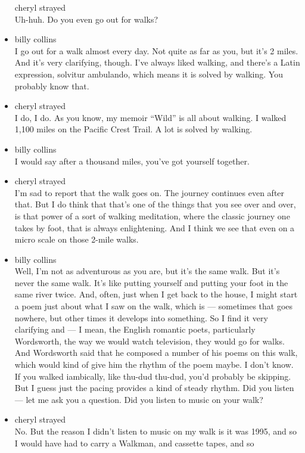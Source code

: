 \begin{itemize}
  cheryl strayed\\
  Uh-huh. Do you even go out for walks?
\item
  billy collins\\
  I go out for a walk almost every day. Not quite as far as you, but
  it's 2 miles. And it's very clarifying, though. I've always liked
  walking, and there's a Latin expression, solvitur ambulando, which
  means it is solved by walking. You probably know that.
\item
  cheryl strayed\\
  I do, I do. As you know, my memoir ``Wild'' is all about walking. I
  walked 1,100 miles on the Pacific Crest Trail. A lot is solved by
  walking.
\item
  billy collins\\
  I would say after a thousand miles, you've got yourself together.
\item
  cheryl strayed\\
  I'm sad to report that the walk goes on. The journey continues even
  after that. But I do think that that's one of the things that you see
  over and over, is that power of a sort of walking meditation, where
  the classic journey one takes by foot, that is always enlightening.
  And I think we see that even on a micro scale on those 2-mile walks.
\item
  billy collins\\
  Well, I'm not as adventurous as you are, but it's the same walk. But
  it's never the same walk. It's like putting yourself and putting your
  foot in the same river twice. And, often, just when I get back to the
  house, I might start a poem just about what I saw on the walk, which
  is --- sometimes that goes nowhere, but other times it develops into
  something. So I find it very clarifying and --- I mean, the English
  romantic poets, particularly Wordsworth, the way we would watch
  television, they would go for walks. And Wordsworth said that he
  composed a number of his poems on this walk, which would kind of give
  him the rhythm of the poem maybe. I don't know. If you walked
  iambically, like thu-dud thu-dud, you'd probably be skipping. But I
  guess just the pacing provides a kind of steady rhythm. Did you listen
  --- let me ask you a question. Did you listen to music on your walk?
\item
  cheryl strayed\\
  No. But the reason I didn't listen to music on my walk is it was 1995,
  and so I would have had to carry a Walkman, and cassette tapes, and so

\end{itemize}
